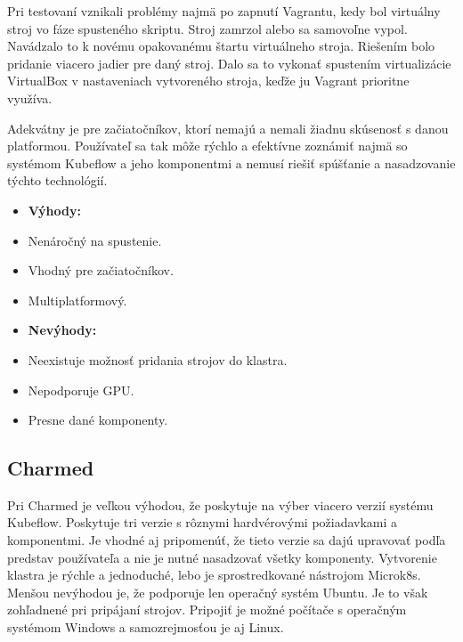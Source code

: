 Pri testovaní vznikali problémy najmä po zapnutí Vagrantu, kedy bol virtuálny stroj vo fáze spusteného skriptu. Stroj zamrzol alebo sa samovoľne vypol. Navádzalo to k novému opakovanému štartu virtuálneho stroja. Riešením bolo pridanie viacero jadier pre daný stroj. Dalo sa to vykonať spustením virtualizácie VirtualBox v nastaveniach vytvoreného stroja, keďže ju Vagrant prioritne využíva.

Adekvátny je pre začiatočníkov, ktorí nemajú a nemali žiadnu skúsenosť s danou platformou. Používateľ sa tak môže rýchlo a efektívne zoznámiť najmä so systémom Kubeflow a jeho komponentmi a nemusí riešiť spúšťanie a nasadzovanie týchto technológií.
\newline
\newline
\begin{minipage}[t]{.45\textwidth}
    \begin{itemize}
        \item []\textbf{Výhody:}
        \item Nenáročný na spustenie.
	    \item Vhodný pre začiatočníkov.
        \item Multiplatformový.
    \end{itemize}
\end{minipage}%
\begin{minipage}[t]{.55\textwidth}
    \begin{itemize}
        \item []\textbf{Nevýhody:}
        \item Neexistuje možnosť pridania strojov do klastra.
	\item Nepodporuje GPU.
    \item Presne dané komponenty.
    \end{itemize}
\end{minipage}

\subsection*{Charmed}

Pri Charmed je veľkou výhodou, že poskytuje na výber viacero verzií systému Kubeflow. Poskytuje tri verzie s rôznymi hardvérovými požiadavkami a komponentmi. Je vhodné aj pripomenúť, že tieto verzie sa dajú upravovať podľa predstav používateľa a nie je nutné nasadzovať všetky komponenty. Vytvorenie klastra je rýchle a jednoduché, lebo je sprostredkované nástrojom Microk8s. Menšou nevýhodou je, že podporuje len operačný systém Ubuntu. Je to však zohľadnené pri pripájaní strojov. Pripojiť je možné počítače s operačným systémom Windows a samozrejmosťou je aj Linux.

